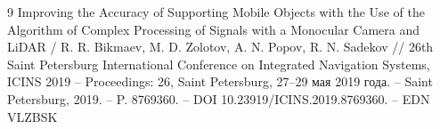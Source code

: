 \documentclass{misisarticle}
\begin{document}
\begin{thebibliography}{9}
\newpage
{} Improving the Accuracy of Supporting Mobile Objects with the Use of the Algorithm of Complex Processing of Signals with a Monocular Camera and LiDAR / R. R. Bikmaev, M. D. Zolotov, A. N. Popov, R. N. Sadekov // 26th Saint Petersburg International Conference on Integrated Navigation Systems, ICINS 2019 -- Proceedings: 26, Saint Petersburg, 27--29 мая 2019 года. -- Saint Petersburg, 2019. -- P. 8769360. -- DOI 10.23919/ICINS.2019.8769360. -- EDN VLZBSK

\end{thebibliography}
\end{document}
